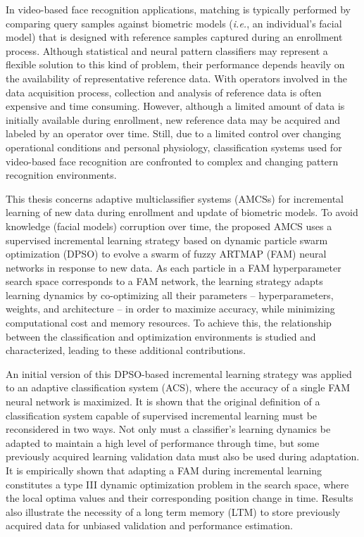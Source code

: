 In video-based face recognition applications, matching is typically performed by comparing query samples against biometric models (\emph{i.e.}, an individual's facial model) that is designed with reference samples captured during an enrollment process.
Although statistical and neural pattern classifiers may represent a flexible solution to this kind of problem, their performance depends heavily on the availability of representative reference data.
With operators involved in the data acquisition process, collection and analysis of reference data is often expensive and time consuming. However, although a limited amount of data is initially available during enrollment, new reference data may be acquired and labeled by an operator over time.
Still, due to a limited control over changing operational conditions and personal physiology, classification systems used for video-based face recognition are confronted to complex and changing pattern recognition environments.

This thesis concerns adaptive multiclassifier systems (AMCSs) for incremental learning of new data during enrollment and update of biometric models.
To avoid knowledge (facial models) corruption over time, the proposed AMCS uses a supervised incremental learning strategy based on dynamic particle swarm optimization (DPSO) to evolve a swarm of fuzzy ARTMAP (FAM) neural networks in response to new data.
As each particle in a FAM hyperparameter search space corresponds to a FAM network, the learning strategy adapts learning dynamics by co-optimizing all their parameters -- hyperparameters, weights, and architecture -- in order to maximize accuracy, while minimizing computational cost and memory resources. To achieve this, the relationship between the classification and optimization environments is studied and characterized, leading to these additional contributions.

An initial version of this DPSO-based incremental learning strategy was applied to an adaptive classification system (ACS), where the accuracy of a single FAM neural network is maximized.
It is shown that the original definition of a classification system capable of supervised incremental learning must be reconsidered in two ways.
Not only must a classifier's learning dynamics be adapted to maintain a high level of performance through time, but some previously acquired learning validation data must also be used during adaptation.
It is empirically shown that adapting a FAM during incremental learning constitutes a type III dynamic optimization problem in the search space, where the local optima values and their corresponding position change in time. Results also illustrate the necessity of a long term memory (LTM) to store previously acquired data for unbiased validation and performance estimation.

